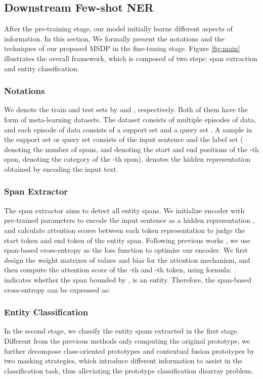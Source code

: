 \documentclass[sigconf,natbib=true,anonymous=False]{acmart}
\begin{document}
\subsection{Downstream Few-shot NER}
After the pre-training stage, our model initially learns different aspects of information. In this section, We formally present the notations and the techniques of our proposed MSDP in the fine-tuning stage. Figure \ref{fig:main} illustrates the overall framework, which is composed of two steps: span extraction and entity classification.

\subsubsection{\textbf{Notations}}

We denote the train and test sets by  and , respectively. Both of them have the form of meta-learning datasets. The dataset consists of multiple episodes of data, and each episode of data  consists of a support set  and a query set . A sample  in the support set or query set consists of the input sentence  and the label set  ( denoting the number of spans,   and  denoting the start and end positions of the -th span,  denoting the category of the -th span).
 denotes the hidden representation obtained by encoding the input text.



\subsubsection{\textbf{Span Extractor}}
The span extractor aims to detect all entity spans. We initialize encoder with pre-trained parameters to encode the input sentence as a hidden representation , and calculate attention scores between each token representation to judge the start token and end token of the entity span. Following previous works \cite{ma2022decomposed,wang2022spanproto}, we use span-based cross-entropy as the loss function to optimise our encoder. We first design the weight matrixes  of values  and bias  for the attention mechanism, and then compute the attention score of the -th and -th token, using formula: .  indicates whether the span bounded by ,  is an entity. Therefore, the span-based cross-entropy can be expressed as:



\subsubsection{\textbf{Entity Classification}}
In the second stage, we classify the entity spans extracted in the first stage. Different from the previous methods only computing the original prototype, we further decompose class-oriented prototypes and contextual fusion prototypes by two masking strategies, which introduce different information to assist in the classification task, thus alleviating the prototype classification disarray problem.
\end{document}
